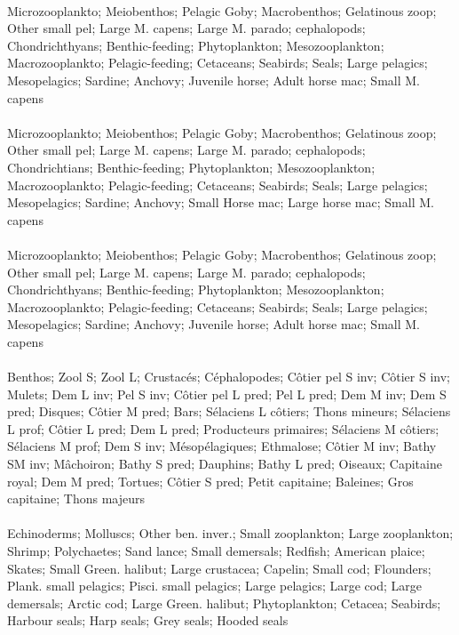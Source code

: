 \fullhline
\hline
{} \\
\hline
Microzooplankto; Meiobenthos; Pelagic Goby; Macrobenthos; Gelatinous zoop; Other small pel; Large M. capens; Large M. parado; cephalopods; Chondrichthyans; Benthic-feeding; Phytoplankton; Mesozooplankton; Macrozooplankto; Pelagic-feeding; Cetaceans; Seabirds; Seals; Large pelagics; Mesopelagics; Sardine; Anchovy; Juvenile horse; Adult horse mac; Small M. capens\\
\fullhline
\hline
{} \\
\hline
Microzooplankto; Meiobenthos; Pelagic Goby; Macrobenthos; Gelatinous zoop; Other small pel; Large M. capens; Large M. parado; cephalopods; Chondrichtians; Benthic-feeding; Phytoplankton; Mesozooplankton; Macrozooplankto; Pelagic-feeding; Cetaceans; Seabirds; Seals; Large pelagics; Mesopelagics; Sardine; Anchovy; Small Horse mac; Large horse mac; Small M. capens\\
\fullhline
\hline
{} \\
\hline
Microzooplankto; Meiobenthos; Pelagic Goby; Macrobenthos; Gelatinous zoop; Other small pel; Large M. capens; Large M. parado; cephalopods; Chondrichthyans; Benthic-feeding; Phytoplankton; Mesozooplankton; Macrozooplankto; Pelagic-feeding; Cetaceans; Seabirds; Seals; Large pelagics; Mesopelagics; Sardine; Anchovy; Juvenile horse; Adult horse mac; Small M. capens\\
\fullhline
\hline
{} \\
\hline
Benthos; Zool S; Zool L; Crustacés; Céphalopodes; Côtier pel S inv; Côtier S inv; Mulets; Dem L inv; Pel S inv; Côtier pel L pred; Pel L pred; Dem M inv; Dem S pred; Disques; Côtier M pred; Bars; Sélaciens L côtiers; Thons mineurs; Sélaciens L prof; Côtier L pred; Dem L pred; Producteurs primaires; Sélaciens M côtiers; Sélaciens M prof; Dem S inv; Mésopélagiques; Ethmalose; Côtier M inv; Bathy SM inv; Mâchoiron; Bathy S pred; Dauphins; Bathy L pred; Oiseaux; Capitaine royal; Dem M pred; Tortues; Côtier S pred; Petit capitaine; Baleines; Gros capitaine; Thons majeurs\\
\fullhline
\hline
{} \\
\hline
Echinoderms; Molluscs; Other ben. inver.; Small zooplankton; Large zooplankton; Shrimp; Polychaetes; Sand lance; Small demersals; Redfish; American plaice; Skates; Small Green. halibut; Large crustacea; Capelin; Small cod; Flounders; Plank. small pelagics; Pisci. small pelagics; Large pelagics; Large cod; Large demersals; Arctic cod; Large Green. halibut; Phytoplankton; Cetacea; Seabirds; Harbour seals; Harp seals; Grey seals; Hooded seals\\
